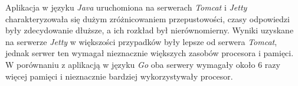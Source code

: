Aplikacja w języku \textsl{Java} uruchomiona na serwerach \textsl{Tomcat} i \textsl{Jetty} charakteryzowała się dużym zróżnicowaniem przepustowości, czasy odpowiedzi były zdecydowanie dłuższe, a ich rozkład był nierównomierny. Wyniki uzyskane na serwerze \textsl{Jetty} w większości przypadków były lepsze od serwera \textsl{Tomcat}, jednak serwer ten wymagał nieznacznie większych zasobów procesora  i pamięci. W porównaniu z aplikacją w języku \textsl{Go} oba serwery wymagały około 6 razy więcej pamięci i nieznacznie bardziej wykorzystywały procesor.


